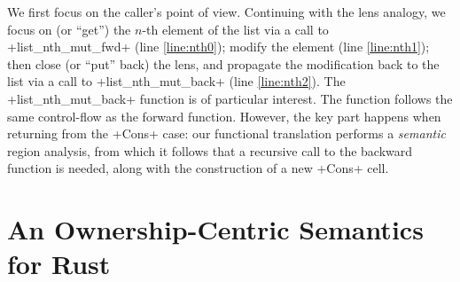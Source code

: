 \documentclass[acmsmall,screen]{acmart}
\newif\iflong
\begin{document}
\fi
\iflong
The complete translation is as follows:
\begin{verbatim}
type list_t (t : Type) =
| ListCons : t -> list_t t -> list_t t
| ListNil : list_t t

let rec list_nth_mut_fwd (t : Type) (l : list_t t) (i : u32) : result t =
  begin match l with
  | ListCons x tl ->
    begin match i with
    | 0 -> Return x
    | _ ->
      i0 <-- u32_sub i 1;
      list_nth_mut_fwd t tl i0
    end
  | ListNil -> Fail
  end

let rec list_nth_mut_back (t : Type) (l : list_t t) (i : u32) (ret : t) : result (list_t t) =
  begin match l with
  | ListCons x tl ->
    begin match i with
    | 0 -> Return (ListCons ret tl)
    | _ ->
      i0 <-- u32_sub i 1;
      l0 <-- list_nth_mut_back t tl i0 ret;
      Return (ListCons x l0)
    end
  | ListNil -> Fail
  end

let rec sum_fwd (l : list_t i32) : result i32 =
  begin match l with
  | ListCons x tl ->
    i <-- sum_fwd tl;
    i32_add x i
    end
  | ListNil -> Return 0
  end

let test_nth_fwd : result unit =
  let l2 = ListCons (1, ListCons (2, ListConst (3, ListNil))) in
  i <-- list_nth_mut_fwd i32 l2 2; !\label{line:nth0}!
  x <-- i32_add i 1; !\label{line:nth1}!
  l2 <-- list_nth_mut_back i32 l2 2 x; !\label{line:nth2}!
  i0 <-- sum_fwd l2;
  massert (not (i0 = 7))

let _ = assert (test_nth_fwd = Return ())
\end{verbatim}
\fi
We first focus on the caller's point of view.
Continuing with the lens analogy, we focus on (or ``get'') the $n$-th element of the list via
a call to \li+list_nth_mut_fwd+ (line \ref{line:nth0}); modify the element (line
\ref{line:nth1}); then
close (or ``put'' back) the lens, and propagate the modification back to the list via a call to
\li+list_nth_mut_back+ (line \ref{line:nth2}).
The \li+list_nth_mut_back+ function is of particular interest. The function
follows the same control-flow as the forward function.
However, the key part happens when returning from the \li+Cons+ case: our
functional translation performs a \emph{semantic} region analysis, from which it follows that a
recursive call to the backward function is needed, along with the construction
of a new \li+Cons+ cell.

\section{An Ownership-Centric Semantics for Rust}
\label{sec:semantics}
\end{document}
